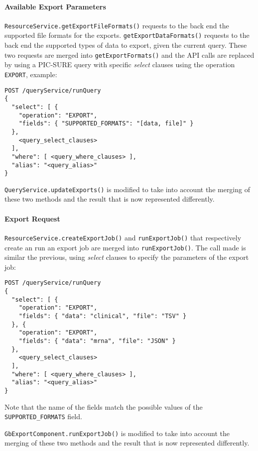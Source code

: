 \paragraph{Available Export Parameters}

\verb|ResourceService.getExportFileFormats()| requests to the back end the supported file formats for the exports.
\verb|getExportDataFormats()| requests to the back end the supported types of data to export, given the current query.
These two requests are merged into \verb|getExportFormats()| and the API calls are replaced by using a PIC-SURE query with specific \emph{select} clauses using the operation \verb|EXPORT|, example:
\begin{verbatim}
POST /queryService/runQuery
{
  "select": [ {
    "operation": "EXPORT",
    "fields": { "SUPPORTED_FORMATS": "[data, file]" }
  }, 
    <query_select_clauses>
  ],
  "where": [ <query_where_clauses> ],
  "alias": "<query_alias>"
} 
\end{verbatim}

\verb|QueryService.updateExports()| is modified to take into account the merging of these two methods and the result that is now represented differently.

\paragraph{Export Request}

\verb|ResourceService.createExportJob()| and \verb|runExportJob()| that respectively create an run an export job are merged into \verb|runExportJob()|.
The call made is similar the previous, using \emph{select} clauses to specify the parameters of the export job:
\begin{verbatim}
POST /queryService/runQuery
{
  "select": [ {
    "operation": "EXPORT",
    "fields": { "data": "clinical", "file": "TSV" }
  }, {
    "operation": "EXPORT",
    "fields": { "data": "mrna", "file": "JSON" }
  }, 
    <query_select_clauses>
  ],
  "where": [ <query_where_clauses> ],
  "alias": "<query_alias>"
} 
\end{verbatim}

Note that the name of the fields match the possible values of the \verb|SUPPORTED_FORMATS| field.

\verb|GbExportComponent.runExportJob()| is modified to take into account the merging of these two methods and the result that is now represented differently.


